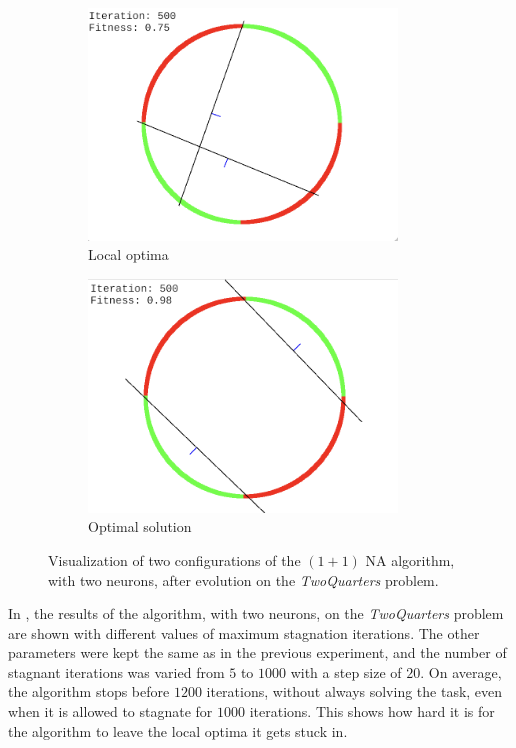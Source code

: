\begin{figure}
    \centering
    \begin{subfigure}{0.45\textwidth}
        \centering
        \includegraphics[width=0.9\textwidth]{Pictures/twoquarters-localopt}
       \caption{Local optima}
    \end{subfigure}\hfill
    \begin{subfigure}{0.45\textwidth}
        \centering
        \includegraphics[width=0.9\textwidth]{Pictures/twoquarters-opt}
        \caption{Optimal solution}
    \end{subfigure}
    \caption{Visualization of two configurations of the $(1 + 1)$ NA algorithm, with two neurons, after evolution on the \textit{TwoQuarters} problem.}
    \label{fig:na_twoquarters_visual}
\end{figure}

In , the results of the algorithm, with two neurons, on the \textit{TwoQuarters} problem are shown with different values of maximum stagnation iterations. The other
parameters were kept the same as in the previous experiment, and the number of stagnant iterations was varied from $5$ to $1000$ with a step size of $20$. On average, the algorithm stops before $1200$
iterations, without always solving the task, even when it is allowed to stagnate for $1000$ iterations. This shows how hard it is for the algorithm to leave the local optima it gets stuck in.


